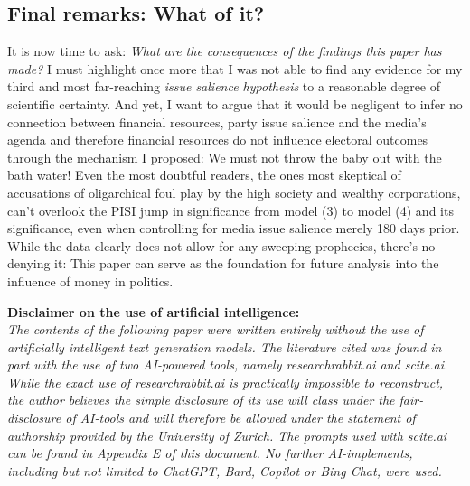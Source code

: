 \documentclass[11pt,a4paper]{article}
\begin{document}
\subsection{Final remarks: What of it?}
It is now time to ask: \textit{What are the consequences of the findings this paper has made?} I must highlight once more that I was not able to find any evidence for my third and most far-reaching \textit{issue salience hypothesis} to a reasonable degree of scientific certainty. And yet, I want to argue that it would be negligent to infer no connection between financial resources, party issue salience and the media's agenda and therefore financial resources do not influence electoral outcomes through the mechanism I proposed: We must not throw the baby out with the bath water! Even the most doubtful readers, the ones most skeptical of accusations of oligarchical foul play by the high society and wealthy corporations, can't overlook the PISI jump in significance from model (3) to model (4) and its significance, even when controlling for media issue salience merely 180 days prior. While the data clearly does not allow for any sweeping prophecies, there's no denying it: This paper can serve as the foundation for future analysis into the influence of money in politics.


\newpage

\printbibliography
{}

\newpage
{}
\vspace*{\fill}
\begin{center}
    \Large\textbf{Disclaimer on the use of artificial intelligence:}\\
    \normalsize
    \textit{
        The contents of the following paper were written entirely without the use of artificially intelligent text generation models. The literature cited was found in part with the use of two AI-powered tools, namely researchrabbit.ai and scite.ai. While the exact use of researchrabbit.ai is practically impossible to reconstruct, the author believes the simple disclosure of its use will class under the fair-disclosure of AI-tools and will therefore be allowed under the statement of authorship provided by the University of Zurich. The prompts used with scite.ai can be found in Appendix E of this document. No further AI-implements, including but not limited to ChatGPT, Bard, Copilot or Bing Chat, were used.
    }
\end{center}
\vspace*{\fill}
\end{document}
